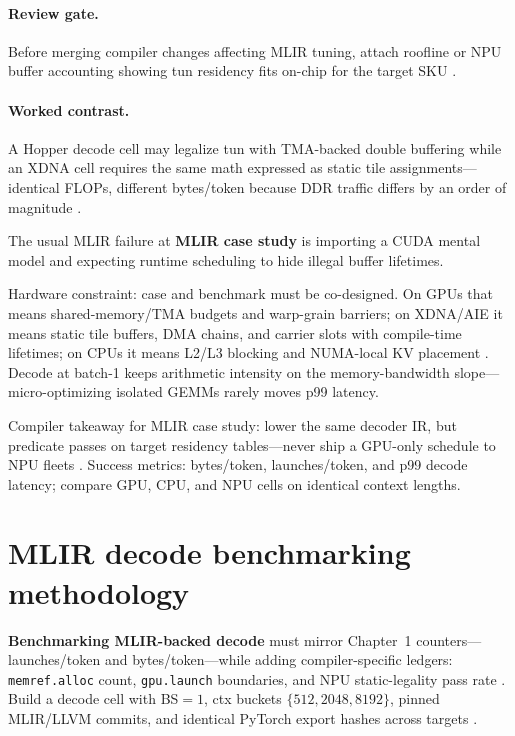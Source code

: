 \paragraph{Review gate.} Before merging compiler changes affecting MLIR tuning, attach roofline or NPU buffer accounting showing tun residency fits on-chip for the target SKU \citep{yirage2026,chen2020compilerbasedhardw}.

\paragraph{Worked contrast.} A Hopper decode cell may legalize tun with TMA-backed double buffering while an XDNA cell requires the same math expressed as static tile assignments---identical FLOPs, different bytes/token because DDR traffic differs by an order of magnitude \citep{yirage2026,chen2020compilerbasedhardw}.

The usual MLIR failure at \textbf{MLIR case study} is importing a CUDA mental model and expecting runtime scheduling to hide illegal buffer lifetimes.

Hardware constraint: case and benchmark must be co-designed. On GPUs that means shared-memory/TMA budgets and warp-grain barriers; on XDNA/AIE it means static tile buffers, DMA chains, and carrier slots with compile-time lifetimes; on CPUs it means L2/L3 blocking and NUMA-local KV placement \citep{yirage2026,chen2020compilerbasedhardw}. Decode at batch-1 keeps arithmetic intensity on the memory-bandwidth slope---micro-optimizing isolated GEMMs rarely moves p99 latency.

Compiler takeaway for MLIR case study: lower the same decoder IR, but predicate passes on target residency tables---never ship a GPU-only schedule to NPU fleets \citep{yirage2026,chen2020compilerbasedhardw}. Success metrics: bytes/token, launches/token, and p99 decode latency; compare GPU, CPU, and NPU cells on identical context lengths.


\section{MLIR decode benchmarking methodology}
\label{sec:ch14_mlir_benchmark}

\textbf{Benchmarking MLIR-backed decode} must mirror Chapter~1 counters---launches/token and bytes/token---while adding compiler-specific ledgers: \texttt{memref.alloc} count, \texttt{gpu.launch} boundaries, and NPU static-legality pass rate \citep{taxbreak2026,memoryfloor2026,chen2020compilerbasedhardw,yirage2026,patel2025llminference,kwon2023vllm,liu2024deepseekv3,amd2024xdna,amd2024aie,dao2022flashattention,dao2023flashdecoding,nvidia2024cudagraphs,nvidia2022hopper,semianalysis2024tma,dlbook}. Build a decode cell with BS${=}1$, ctx buckets $\{512,2048,8192\}$, pinned MLIR/LLVM commits, and identical PyTorch export hashes across targets \citep{yirage2026,chen2020compilerbasedhardw,patel2025llminference,memoryfloor2026,taxbreak2026,kwon2023vllm,liu2024deepseekv3,amd2024aie,amd2024xdna,dao2022flashattention,dao2023flashdecoding,nvidia2024cudagraphs,nvidia2022hopper,semianalysis2024tma,dlbook}.

